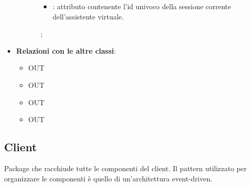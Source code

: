 \begin{itemize}
\begin{itemize}
\begin{itemize}
\begin{itemize}
   \item {}: attributo contenente l'id univoco della sessione corrente dell'assistente virtuale.
\end{itemize}
;
		\end{itemize}
	\end{itemize}
	\item \textbf{Relazioni con le altre classi}:
	\begin{itemize}
		\item OUT \hyperlink{LambdaContext_label}{}
		\item OUT \hyperlink{<<interface>> AgentsDAO_label}{}
		\item OUT \hyperlink{<<interface>> VAModule_label}{}
		\item OUT \hyperlink{LambdaEvent_label}{}
	\end{itemize}
\end{itemize}
\FloatBarrier

\subsection{Client}
Package che racchiude tutte le componenti del client. Il pattern utilizzato per organizzare le componenti è quello di un'architettura event-driven.
